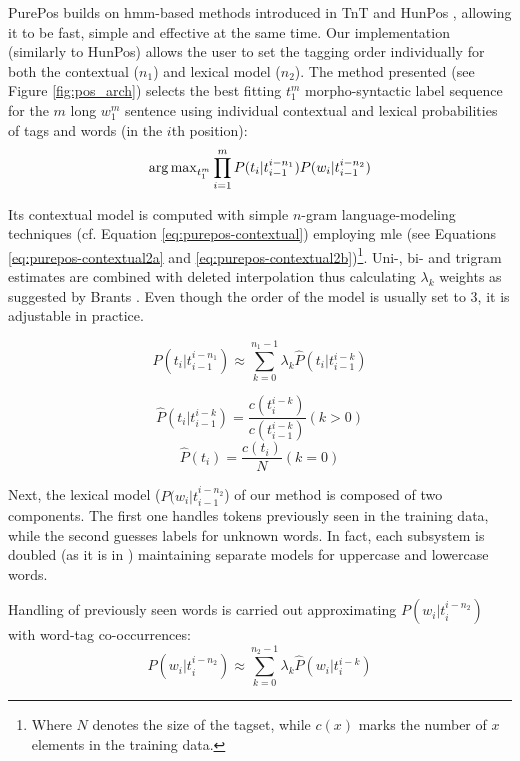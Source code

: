 PurePos builds on \acrshort{hmm}-based methods \cite{Rabiner1989,Samuelsson1993} introduced in TnT \cite{Brants2000} and HunPos \cite{Halacsy2007}, allowing it to be fast, simple and effective at the same time. 
Our implementation (similarly to HunPos) allows the user to set the tagging order individually for both the contextual ($n_1$) and lexical model ($n_2$).
The method presented (see Figure \ref{fig:pos_arch}) selects the best fitting $t_1^m$ morpho-syntactic label sequence for the $m$ long $w_1^m$ sentence using individual contextual and lexical probabilities of tags and words (in the $i$th position):
\begin{equation}
\operatorname{arg\,max}_{t_1^m} \prod_{i=1}^m P(t_i | t_{i-1}^{i-n_1}) P(w_i|t_{i-1}^{i-n_2})
\end{equation}

Its contextual model is computed with simple $n$-gram language-modeling techniques (cf. Equation \ref{eq:purepos-contextual}) employing \gls{mle} (see Equations \ref{eq:purepos-contextual2a} and \ref{eq:purepos-contextual2b})\footnote{Where $N$ denotes the size of the tagset, while $c(x)$ marks the number of $x$ elements in the training data.}. 
Uni-, bi- and trigram estimates are combined with deleted interpolation thus calculating $\lambda_k$ weights as suggested by Brants \cite{Brants2000}. Even though the order of the model is usually set to 3, it is adjustable in practice. 


\begin{equation}\label{eq:purepos-contextual}
P(t_i | t_{i-1}^{i-n_1}) \approx \sum_{k=0}^{n_1-1} \lambda_k \hat{P}(t_i|t_{i-1}^{i-k})
\end{equation}

\begin{equation}\label{eq:purepos-contextual2a}
\hat{P}(t_i|t_{i-1}^{i-k}) = \frac{c(t^{i-k}_i)}{c(t_{i-1}^{i-k})} (k>0) 
\end{equation}
\begin{equation}\label{eq:purepos-contextual2b}
\hat{P}(t_i) = \frac{c(t_i)}{N} (k=0)
\end{equation}

Next, the lexical model ($P(w_i|t_{i-1}^{i-n_2}$) of our method is composed of two components. 
The first one handles tokens previously seen in the training data, while the second guesses labels for unknown words. 
In fact, each subsystem is doubled (as it is in \cite{Brants2000,Halacsy2007}) maintaining separate models for uppercase and lowercase words. 

Handling of previously seen words is carried out approximating $P(w_i | t_{i}^{i-n_2})$ with word-tag co-occurrences: 
\begin{equation} \label{eq:purepos-lexical}
P(w_i | t_{i}^{i-n_2}) \approx  \sum_{k=0}^{n_2-1} \lambda_k \hat{P}(w_i|t_{i}^{i-k})
\end{equation}

